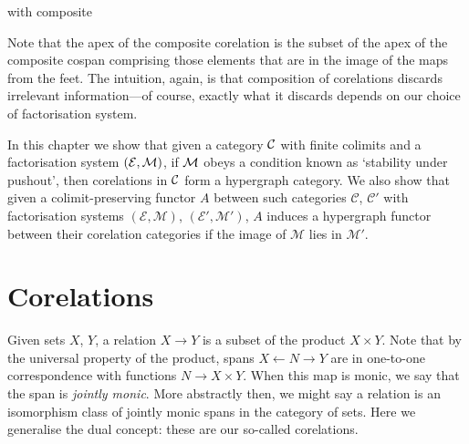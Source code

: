 with composite
\begin{center}
\end{center}
Note that the apex of the composite corelation is the subset of the apex of the
composite cospan comprising those elements that are in the image of the maps
from the feet. The intuition, again, is that composition of corelations discards
irrelevant information---of course, exactly what it discards depends on our
choice of factorisation system.

In this chapter we show that given a category $\mathcal C$ with finite colimits and a
factorisation system $(\mathcal E,\mathcal M)$, if $\mathcal M$ obeys a condition known as
`stability under pushout', then corelations in $\mathcal C$ form a hypergraph
category. We also show that given a colimit-preserving functor $A$ between such
categories $\mathcal C$, $\mathcal C'$ with factorisation systems $(\mathcal E,
\mathcal M)$, $(\mathcal E', \mathcal M')$, $A$ induces a hypergraph functor
between their corelation categories if the image of $\mathcal M$ lies in
$\mathcal M'$.

\section{Corelations} \label{sec.corels}

Given sets $X$, $Y$, a relation $X \to Y$ is a subset of the product $X
\times Y$. Note that by the universal property of the product, spans $X
\leftarrow N \to Y$ are in one-to-one correspondence with functions $N \to X
\times Y$. When this map is monic, we say that the span is \emph{jointly monic}.
More abstractly then, we might say a relation is an isomorphism class of jointly
monic spans in the category of sets. Here we generalise the dual concept: these
are our so-called corelations.


